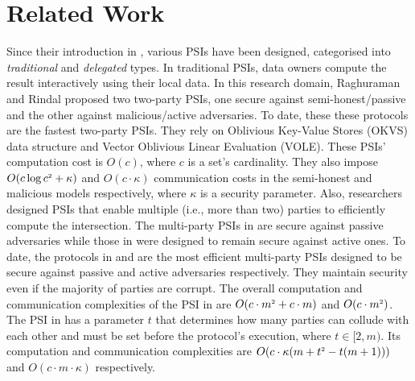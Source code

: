 

\vspace{-2.5mm}
\section{Related Work}\label{sec::related-work}
\vspace{-1mm}

Since their introduction in \cite{DBLP:conf/eurocrypt/FreedmanNP04}, various PSIs have been designed, categorised into \textit{traditional} and \textit{delegated} types.  
%
In traditional PSIs, data owners compute the result interactively using their local data.
%
In this research domain, Raghuraman and Rindal \cite{RaghuramanR22} proposed two two-party PSIs, one secure against semi-honest/passive and the other against malicious/active adversaries. To date, these these protocols are the fastest two-party PSIs. They rely on  Oblivious Key-Value Stores (OKVS) data structure and Vector Oblivious Linear Evaluation (VOLE). These PSIs' computation cost is $O(c)$, where $c$ is  a set's cardinality.  They also impose $O(c\log c^{\scriptscriptstyle 2}+\kappa)$ and $O(c\cdot \kappa)$ communication costs in the semi-honest and malicious models respectively, 
where 
$\kappa$ is a security parameter.  
%
Also, researchers designed PSIs that enable multiple (i.e., more than two) parties to efficiently compute the intersection. The multi-party PSIs in  \cite{DBLP:conf/scn/InbarOP18,DBLP:conf/ccs/KolesnikovMPRT17} are secure against  passive adversaries while those in \cite{Ben-EfraimNOP22,GhoshN19,ZhangLLJL19,DBLP:conf/ccs/KolesnikovMPRT17,NevoTY21} were designed to remain secure against active ones. 
%
%
To date, the  protocols  in   \cite{DBLP:conf/ccs/KolesnikovMPRT17} and  \cite{NevoTY21} are the most  efficient multi-party PSIs  designed to be  secure against passive and active  adversaries respectively. They maintain security even if  the majority of parties are corrupt.  The overall computation and communication complexities of the PSI in  \cite{DBLP:conf/ccs/KolesnikovMPRT17} are  $O(c\cdot m^{\scriptscriptstyle 2}+c\cdot m )$ and $O(c\cdot m^{\scriptscriptstyle 2})$. 
%
%
The PSI in \cite{NevoTY21} has a parameter $t$ that determines how many parties can collude with each other and must be set before the protocol's execution, where $t\in [2, m)$.  
%
%
Its computation and communication complexities are $O(c\cdot \kappa(m+t^{\scriptscriptstyle 2}-t(m+1)))$ and $O(c\cdot m\cdot \kappa)$ respectively.



